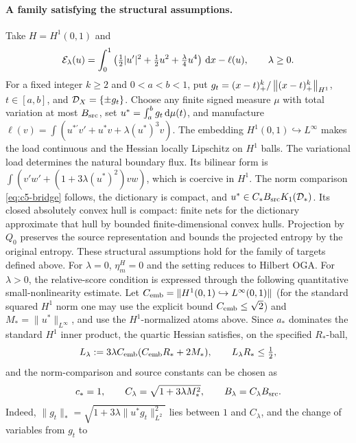 \documentclass[11pt]{article}
\theoremstyle{remark}
\begin{document}
\paragraph{A family satisfying the structural assumptions.}
Take $H=H^1(0,1)$ and
\[
 \mathcal E_\lambda(u)=\int_0^1
 \left(\tfrac12|u'|^2+\tfrac12u^2+\tfrac\lambda4u^4\right)\,\mathrm d x-\ell(u),
 \qquad\lambda\geq0 .
\]
For a fixed integer $k\geq2$ and $0<a<b<1$, put
$g_t=(x-t)_+^k/\left\lVert(x-t)_+^k\right\rVert_{H^1}$, $t\in[a,b]$,
and $\mathcal D_X=\{\pm g_t\}$.
Choose any finite signed measure $\mu$ with total variation at most
$B_{\rm src}$, set $u^*=\int_a^b g_t\,\mathrm d\mu(t)$, and manufacture
$\ell(v)=\int(u^{*\prime}v'+u^*v+\lambda(u^*)^3v)$.
The embedding \(H^1(0,1)\hookrightarrow L^\infty\) makes the load continuous and the Hessian locally Lipschitz on \(H^1\) balls. The variational load determines the natural boundary flux.
Its bilinear form is
$\int(v'w'+(1+3\lambda(u^*)^2)vw)$, which is coercive in $H^1$.
The norm comparison \eqref{eq:c5-bridge} follows, the dictionary is compact,
and $u^*\in C_*B_{\rm src}K_1(\mathcal D_*)$.
Its closed absolutely convex hull is compact: finite nets for the
dictionary approximate that hull by bounded finite-dimensional convex hulls.
Projection by \(Q_0\) preserves the source representation and bounds the projected entropy by the original entropy. These structural assumptions hold for the family of targets defined above.
For \(\lambda=0\), \(\eta_m^H=0\) and the setting reduces to Hilbert OGA. For \(\lambda>0\), the relative-score condition is expressed through the following quantitative small-nonlinearity estimate. Let
$C_{\rm emb}=\|H^1(0,1)\hookrightarrow L^\infty(0,1)\|$ (for the
standard squared $H^1$ norm one may use the explicit bound
$C_{\rm emb}\leq\sqrt2$) and
$M_* = \|u^*\|_{L^\infty}$, and use the $H^1$-normalized atoms above.
Since $a_*$ dominates the standard $H^1$ inner product, the quartic
Hessian satisfies, on the specified $R_*$-ball,
\begin{equation}
 L_\lambda:=3\lambda C_{\rm emb}
       (C_{\rm emb}R_*+2M_*),\qquad L_\lambda R_*\leq\tfrac12,
 \label{eq:c5-family-hessian-constant}
\end{equation}
and the norm-comparison and source constants can be chosen as
\begin{equation}
 c_*=1,\qquad C_\lambda=\sqrt{1+3\lambda M_*^2},\qquad
 B_\lambda=C_\lambda B_{\rm src}.
 \label{eq:c5-family-bridge-constants}
\end{equation}
Indeed, $\|g_t\|_*=\sqrt{1+3\lambda\|u^*g_t\|_{L^2}^2}$ lies
between $1$ and $C_\lambda$, and the change of variables from $g_t$ to
\end{document}

